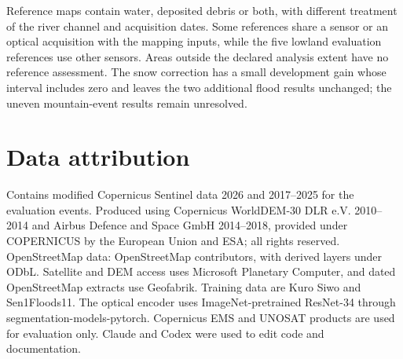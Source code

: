 \documentclass[10pt,twocolumn,letterpaper]{article}
\begin{document}
Reference maps contain water, deposited debris or both, with different treatment of the river
channel and acquisition dates. Some references share a sensor or an optical acquisition with the
mapping inputs, while the five lowland evaluation references use other sensors. Areas outside the
declared analysis extent have no reference assessment. The snow correction has a small development
gain whose interval includes zero and leaves the two additional flood results unchanged; the uneven
mountain-event results remain unresolved.

\section*{Data attribution}
Contains modified Copernicus Sentinel data 2026 and 2017--2025 for the evaluation events. Produced
using Copernicus WorldDEM-30 \textcopyright{} DLR e.V. 2010--2014 and \textcopyright{} Airbus
Defence and Space GmbH 2014--2018, provided under COPERNICUS by the European Union and ESA; all
rights reserved. OpenStreetMap data: \textcopyright{} OpenStreetMap contributors, with derived
layers under ODbL. Satellite and DEM access uses Microsoft Planetary Computer, and dated
OpenStreetMap extracts use Geofabrik. Training data are Kuro Siwo and Sen1Floods11. The optical
encoder uses ImageNet-pretrained ResNet-34 through segmentation-models-pytorch. Copernicus EMS and
UNOSAT products are used for evaluation only. Claude and Codex were used to edit code and
documentation.
\end{document}
